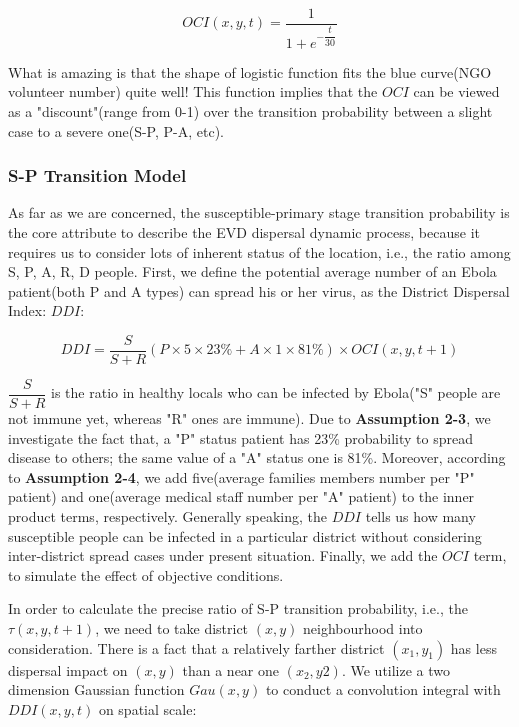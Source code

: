 \begin{equation}
OCI\left( x,y,t\right) =\dfrac {1}{1+e^{-\dfrac{t}{30}}}
\end{equation}

What is amazing is that the shape of logistic function fits the blue curve(NGO volunteer number) quite well! This function implies that the $OCI$ can be viewed as a "discount"(range from 0-1) over the transition probability between a slight case to a severe one(S-P, P-A, etc).

\subsubsection{S-P Transition Model}
As far as we are concerned, the susceptible-primary stage transition probability is the core attribute to describe the EVD dispersal dynamic process, because it requires us to consider lots of inherent status of the location, i.e., the ratio among S, P, A, R, D people. First, we define the potential average number of an Ebola patient(both P and A types) can spread his or her virus, as the District Dispersal Index: $DDI$:

\begin{equation}
DDI=\dfrac {S}{S+R}\left({P}\times 5\times 23\% +{A}\times 1\times 81\% \right)\times OCI(x,y,t+1)
\end{equation}

$\dfrac {S}{S+R}$ is the ratio in healthy locals who can be infected by Ebola("S" people are not immune yet, whereas "R" ones are immune). Due to \textbf{Assumption 2-3}, we investigate the fact\cite{mushengxue} that, a "P" status patient has 23\% probability to spread disease to others; the same value of a "A" status one is 81\%. Moreover, according to \textbf{Assumption 2-4}, we add five(average families members number per "P" patient) and one(average medical staff number per "A" patient) to the inner product terms, respectively. 
Generally speaking, the $DDI$ tells us how many susceptible people can be infected in a particular district without considering inter-district spread cases under present situation. Finally, we add the $OCI$ term, to simulate the effect of objective conditions.

In order to calculate the precise ratio of S-P transition probability, i.e., the $\tau(x,y,t+1)$, we need to take district $(x,y)$ neighbourhood into consideration. There is a fact that a relatively farther district $(x_{1},y_{1})$ has less dispersal impact on $(x,y)$ than a near one $(x_{2},y{2})$. We utilize a two dimension Gaussian function $Gau(x,y)$ to conduct a convolution integral with $DDI(x,y,t)$ on spatial scale:

